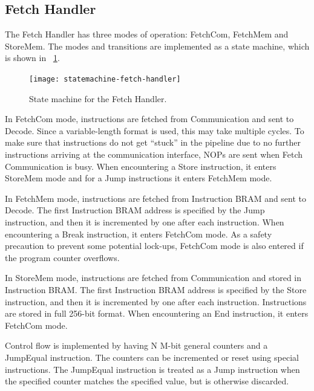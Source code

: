 \subsection{Fetch Handler}

The Fetch Handler has three modes of operation: FetchCom, FetchMem and StoreMem.
The modes and transitions are implemented as a state machine, which is shown in \figurename~\ref{fig:statemachine-fetch-handler}.

\begin{figure}[!ht]
    \centering
    \texttt{[image: statemachine-fetch-handler]}
    \caption[Fetch Handler state machine]{State machine for the Fetch Handler.}
    \label{fig:statemachine-fetch-handler}
\end{figure}

In FetchCom mode, instructions are fetched from Communication and sent to Decode.
Since a variable-length format is used, this may take multiple cycles.
To make sure that instructions do not get ``stuck'' in the pipeline due to no further instructions arriving at the communication interface, NOPs are sent when Fetch Communication is busy.
When encountering a Store instruction, it enters StoreMem mode and for a Jump instructions it enters FetchMem mode.

In FetchMem mode, instructions are fetched from Instruction BRAM and sent to Decode.
The first Instruction BRAM address is specified by the Jump instruction, and then it is incremented by one after each instruction.
When encountering a Break instruction, it enters FetchCom mode.
As a safety precaution to prevent some potential lock-ups, FetchCom mode is also entered if the program counter overflows.

In StoreMem mode, instructions are fetched from Communication and stored in Instruction BRAM.
The first Instruction BRAM address is specified by the Store instruction, and then it is incremented by one after each instruction.
Instructions are stored in full 256-bit format.
When encountering an End instruction, it enters FetchCom mode.

Control flow is implemented by having N M-bit general counters and a JumpEqual instruction.
The counters can be incremented or reset using special instructions.
The JumpEqual instruction is treated as a Jump instruction when the specified counter matches the specified value, but is otherwise discarded.


